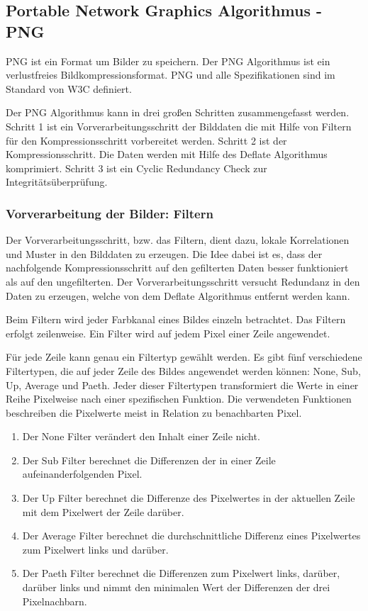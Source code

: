 \documentclass[conference]{IEEEtran}
\begin{document}
\subsection{Portable Network Graphics Algorithmus - PNG}

PNG ist ein Format um Bilder zu speichern.
Der PNG Algorithmus ist ein verlustfreies Bildkompressionsformat.
PNG und alle Spezifikationen sind im Standard von W3C definiert. \cite{w3c}

Der PNG Algorithmus kann in drei großen Schritten zusammengefasst werden.
Schritt 1 ist ein Vorverarbeitungsschritt der Bilddaten die mit Hilfe von
Filtern für den Kompressionsschritt vorbereitet werden.
Schritt 2 ist der Kompressionsschritt.
Die Daten werden mit Hilfe des Deflate Algorithmus komprimiert.
Schritt 3 ist ein Cyclic Redundancy Check zur Integritätsüberprüfung.


\subsubsection{Vorverarbeitung der Bilder: Filtern}

Der Vorverarbeitungsschritt, bzw. das Filtern, dient dazu, lokale Korrelationen und
Muster in den Bilddaten zu erzeugen.
Die Idee dabei ist es, dass der nachfolgende Kompressionsschritt
auf den gefilterten Daten besser funktioniert als auf den ungefilterten.
Der Vorverarbeitungsschritt versucht Redundanz in den Daten zu erzeugen, welche
von dem Deflate Algorithmus entfernt werden kann.

Beim Filtern wird jeder Farbkanal eines Bildes einzeln betrachtet.
Das Filtern erfolgt zeilenweise.
Ein Filter wird auf jedem Pixel einer Zeile angewendet.

Für jede Zeile kann genau ein Filtertyp gewählt werden.
Es gibt fünf verschiedene Filtertypen, die auf jeder Zeile
des Bildes angewendet werden können: None, Sub, Up, Average und Paeth.
Jeder dieser Filtertypen transformiert die Werte in einer Reihe Pixelweise nach einer spezifischen
Funktion.
Die verwendeten Funktionen beschreiben die Pixelwerte meist in Relation zu benachbarten Pixel.

\begin{enumerate}
  \item Der None Filter verändert den Inhalt einer Zeile nicht.
  \item Der Sub Filter berechnet die Differenzen der in einer Zeile aufeinanderfolgenden Pixel.
  \item Der Up Filter berechnet die Differenze des Pixelwertes in der aktuellen Zeile mit
        dem Pixelwert der Zeile darüber.
  \item Der Average Filter berechnet die durchschnittliche Differenz eines Pixelwertes zum
        Pixelwert links und darüber.
  \item Der Paeth Filter berechnet die Differenzen zum Pixelwert links, darüber, darüber links und nimmt den
        minimalen Wert der Differenzen der drei Pixelnachbarn.
\end{enumerate}
\end{document}
